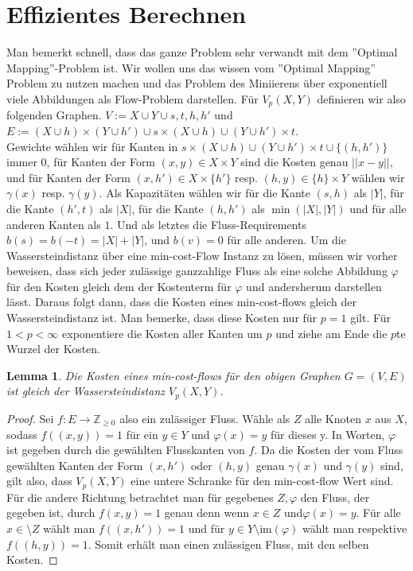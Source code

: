 \documentclass[11pt, a4paper,draft]{report}
\newtheorem{lemma}{Lemma}
\newcommand{\bZ}{\mathbb{Z}}
\newcommand{\im}{\textrm{im}}
\begin{document}
 	\section{Effizientes Berechnen}
 	
 	Man bemerkt schnell, dass das ganze Problem sehr verwandt mit dem ''Optimal Mapping''-Problem ist. Wir wollen uns das wissen vom ''Optimal Mapping'' Problem zu nutzen machen und das Problem des Miniierens über exponentiell viele Abbildungen als Flow-Problem darstellen. Für $V_p(X,Y)$ definieren wir also folgenden Graphen. $V := X\cup Y\cup {s,t,h,h'}$ und $E := (X\cup h)\times (Y\cup h') \cup {s}\times (X\cup h)  \cup (Y\cup h')\times t$.\\
 	Gewichte wählen wir für Kanten in ${s}\times (X\cup h)  \cup (Y\cup h')\times t \cup \{(h,h')\}$ immer 0, für Kanten der Form $(x,y)\in X\times Y$ sind die Kosten genau $||x-y||$, und für Kanten der Form $(x,h')\in X\times \{h'\}$ resp. $(h,y)\in \{h\}\times Y$ wählen wir $\gamma(x)$ resp. $\gamma(y)$. Als Kapazitäten wählen wir für die Kante $(s,h)$ als $|Y|$, für die Kante $(h',t)$ als $|X|$, für die Kante $(h,h')$ als $\min(|X|,|Y|)$ und für alle anderen Kanten als $1$. Und als letztes die Fluss-Requirements $b(s) = b(-t) = |X|+|Y|$, und $b(v)=0$ für alle anderen. Um die Wassersteindistanz über eine min-cost-Flow Instanz zu lösen, müssen wir vorher beweisen, dass sich jeder zulässige ganzzahlige Fluss als eine solche Abbildung $\varphi$ für den Kosten gleich dem der Kostenterm für $\varphi$ und andersherum darstellen lässt. Daraus folgt dann, dass die Kosten eines min-cost-flows gleich der Wassersteindistanz ist. Man bemerke, dass diese Kosten nur für $p=1$ gilt. Für $1<p<\infty$ exponentiere die Kosten aller Kanten um $p$ und ziehe am Ende die $p$te Wurzel der Kosten.
 	
 	\begin{lemma}
 		Die Kosten eines min-cost-flows für den obigen Graphen $G=(V,E)$ ist gleich der Wassersteindistanz $V_p(X,Y)$.
 	\end{lemma}
 	\begin{proof}
 		Sei $f:E\rightarrow \bZ_{\geq0}$ also ein zulässiger Fluss. Wähle als $Z$ alle Knoten $x$ aus $X$, sodass $f((x,y))=1$ für ein $y\in Y$ und $\varphi(x) = y$ für dieses y. In Worten, $\varphi$ ist gegeben durch die gewählten Flusskanten von $f$. Da die Kosten der vom Fluss gewählten Kanten der Form $(x,h')$ oder $(h,y)$ genau $\gamma(x)$ und $\gamma(y)$ sind, gilt also, dass $V_p(X,Y)$ eine untere Schranke für den min-cost-flow Wert sind.\\
 		Für die andere Richtung betrachtet man für gegebenes $Z,\varphi$ den Fluss, der gegeben ist, durch $f(x,y)=1$ genau denn wenn $x\in Z$ und$ \varphi(x)=y$. Für alle $x\in \setminus Z$ wählt man $f((x,h'))=1$ und für $y\in Y\setminus \im(\varphi)$ wählt man respektive $f((h,y))=1$. Somit erhält man einen zulässigen Fluss, mit den selben Kosten.
 	\end{proof}
 
\end{document}
